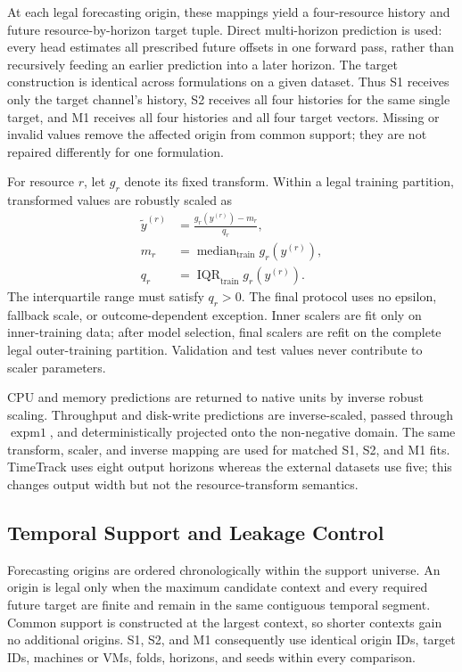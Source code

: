 \documentclass[a4paper,fleqn]{cas-dc}
\begin{document}
At each legal forecasting origin, these mappings yield a four-resource history
and future resource-by-horizon target tuple.  Direct multi-horizon prediction is
used: every head estimates all prescribed future offsets in one forward pass,
rather than recursively feeding an earlier prediction into a later horizon.
The target construction is identical across formulations on a given dataset.
Thus S1 receives only the target channel's history, S2 receives all four
histories for the same single target, and M1 receives all four histories and
all four target vectors.  Missing or invalid values remove the affected origin
from common support; they are not repaired differently for one formulation.

For resource $r$, let $g_r$ denote its fixed transform.  Within a legal
training partition, transformed values are robustly scaled as
\begin{equation}
  \begin{aligned}
    \widetilde{y}^{(r)}
      &= \frac{g_r(y^{(r)})-m_r}{q_r}, \\
    m_r &= \operatorname{median}_{\mathrm{train}} g_r(y^{(r)}), \\
    q_r &= \operatorname{IQR}_{\mathrm{train}} g_r(y^{(r)}).
  \end{aligned}
  \label{eq:robust-scaling}
\end{equation}
The interquartile range must satisfy $q_r>0$.  The final protocol uses no
epsilon, fallback scale, or outcome-dependent exception.  Inner scalers are fit
only on inner-training data; after model selection, final scalers are refit on
the complete legal outer-training partition.  Validation and test values never
contribute to scaler parameters.

CPU and memory predictions are returned to native units by inverse robust
scaling.  Throughput and disk-write predictions are inverse-scaled, passed
through $\operatorname{expm1}$, and deterministically projected onto the
non-negative domain.  The same transform, scaler, and inverse mapping are used
for matched S1, S2, and M1 fits.  TimeTrack uses eight output horizons whereas
the external datasets use five; this changes output width but not the
resource-transform semantics.

\subsection{Temporal Support and Leakage Control}
\label{sec:leakage-control}

Forecasting origins are ordered chronologically within the support universe.
An origin is legal only when the maximum candidate context and every required
future target are finite and remain in the same contiguous temporal segment.
Common support is constructed at the largest context, so shorter contexts gain
no additional origins.  S1, S2, and M1 consequently use identical origin IDs,
target IDs, machines or VMs, folds, horizons, and seeds within every
comparison.
\end{document}
